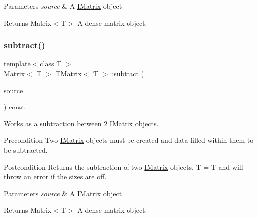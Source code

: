 \begin{DoxyParams}{Parameters}
{\em source} & A \mbox{\hyperlink{class_i_matrix}{I\+Matrix}} object \\
\hline
\end{DoxyParams}
\begin{DoxyReturn}{Returns}
Matrix$<$\+T$>$ A dense matrix object. 
\end{DoxyReturn}
\mbox{\label{class_t_matrix_a2208a6ce98de3552f4ddf749464e5c81}} 
\subsubsection{\texorpdfstring{subtract()}{subtract()}\hspace{0.1cm}{\footnotesize\ttfamily [2/6]}}
{\footnotesize\ttfamily template$<$class T $>$ \\
\mbox{\hyperlink{class_matrix}{Matrix}}$<$ T $>$ \mbox{\hyperlink{class_t_matrix}{T\+Matrix}}$<$ T $>$\+::subtract (\begin{DoxyParamCaption}\item[{const \mbox{\hyperlink{class_i_matrix}{I\+Matrix}}$<$ \mbox{\hyperlink{class_t_matrix}{T\+Matrix}}$<$ T $>$, T $>$ \&}]{source }\end{DoxyParamCaption}) const\hspace{0.3cm}{\ttfamily [virtual]}}



Works as a subtraction between 2 \mbox{\hyperlink{class_i_matrix}{I\+Matrix}} objects. 

\begin{DoxyPrecond}{Precondition}
Two \mbox{\hyperlink{class_i_matrix}{I\+Matrix}} objects must be created and data filled within them to be subtracted. 
\end{DoxyPrecond}
\begin{DoxyPostcond}{Postcondition}
Returns the subtraction of two \mbox{\hyperlink{class_i_matrix}{I\+Matrix}} objects. T = T and will throw an error if the sizes are off.
\end{DoxyPostcond}

\begin{DoxyParams}{Parameters}
{\em source} & A \mbox{\hyperlink{class_i_matrix}{I\+Matrix}} object \\
\hline
\end{DoxyParams}
\begin{DoxyReturn}{Returns}
Matrix$<$\+T$>$ A dense matrix object. 
\end{DoxyReturn}


